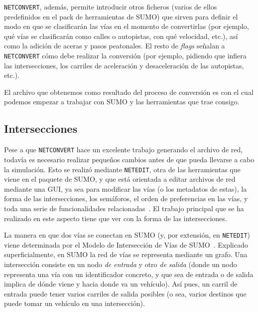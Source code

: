 
\texttt{NETCONVERT}, además, permite introducir otros ficheros (varios de ellos predefinidos en el pack de herramientas de SUMO) que sirven para definir el modo en que se clasificarán las vías en el momento de convertirlas (por ejemplo, qué vías se clasificarán como calles o autopistas, con qué velocidad, etc.), así como la adición de aceras y pasos peatonales. El resto de \textit{flags} señalan a \texttt{NETCONVERT} cómo debe realizar la conversión (por ejemplo, pidiendo que infiera las intersecciones, los carriles de aceleración y desaceleración de las autopistas, etc.).

El archivo que obtenemos como resultado del proceso de conversión es con el cual podemos empezar a trabajar con SUMO y las herramientas que trae consigo.

\subsection{Intersecciones}

Pese a que \texttt{NETCONVERT} hace un excelente trabajo generando el archivo de red, todavía es necesario realizar pequeños cambios antes de que pueda llevarse a cabo la simulación. Esto se realizó mediante \texttt{NETEDIT}, otra de las herramientas que viene en el paquete de SUMO, y que está orientada a editar archivos de red mediante una GUI, ya sea para modificar las vías (o los metadatos de estas), la forma de las intersecciones, los semáforos, el orden de preferencias en las vías, y toda una serie de funcionalidades relacionadas~\cite{noauthor_netedit_nodate}. El trabajo principal que se ha realizado en este aspecto tiene que ver con la forma de las intersecciones. 

La manera en que dos vías se conectan en SUMO (y, por extensión, en \texttt{NETEDIT}) viene determinada por el Modelo de Intersección de Vías de SUMO~\cite{erdmann_sumos_2014}. Explicado superficialmente, en SUMO la red de vías se representa mediante un grafo. Una intersección consiste en un nodo \textit{de entrada} y otro \textit{de salida} (donde un nodo representa una vía con un identificador concreto, y que sea de entrada o de salida implica de dónde viene y hacia donde va un vehículo). Así pues, un carril de entrada puede tener varios carriles de salida posibles (o sea, varios destinos que puede tomar un vehículo en una intersección).

